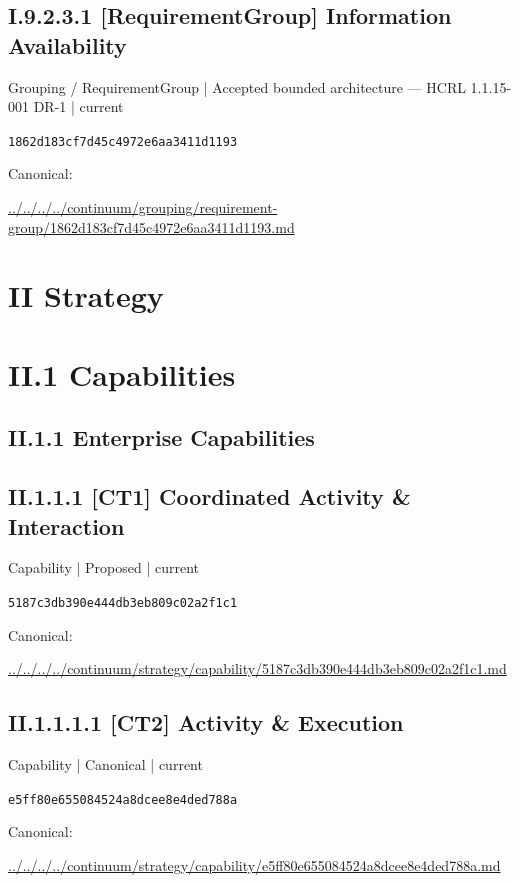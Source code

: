 \documentclass[10pt,a4paper]{article}
\begin{document}
\subsection*{I.9.2.3.1 [RequirementGroup] Information Availability}
\label{element-1862d183cf7d45c4972e6aa3411d1193}
{\small Grouping / RequirementGroup | Accepted bounded architecture — HCRL 1.1.15-001 DR-1 | current}\par
\texttt{1862d183cf7d45c4972e6aa3411d1193}\par
Canonical: \par
{\footnotesize\url{../../../../continuum/grouping/requirement-group/1862d183cf7d45c4972e6aa3411d1193.md}}\par
\section*{II Strategy}
\section*{II.1 Capabilities}
\subsection*{II.1.1 Enterprise Capabilities}
\subsection*{II.1.1.1 [CT1] Coordinated Activity \& Interaction}
\label{element-5187c3db390e444db3eb809c02a2f1c1}
{\small Capability | Proposed | current}\par
\texttt{5187c3db390e444db3eb809c02a2f1c1}\par
Canonical: \par
{\footnotesize\url{../../../../continuum/strategy/capability/5187c3db390e444db3eb809c02a2f1c1.md}}\par
\subsection*{II.1.1.1.1 [CT2] Activity \& Execution}
\label{element-e5ff80e655084524a8dcee8e4ded788a}
{\small Capability | Canonical | current}\par
\texttt{e5ff80e655084524a8dcee8e4ded788a}\par
Canonical: \par
{\footnotesize\url{../../../../continuum/strategy/capability/e5ff80e655084524a8dcee8e4ded788a.md}}\par
\end{document}
